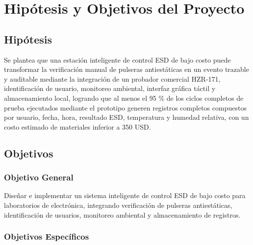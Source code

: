 \chapter{Hipótesis y Objetivos del Proyecto}

\section{Hipótesis}

Se plantea que una estación inteligente de control ESD de bajo costo puede transformar la verificación manual 
de pulseras antiestáticas en un evento trazable y auditable mediante la integración de un probador comercial HZR-171, 
identificación de usuario, monitoreo ambiental, interfaz gráfica táctil y almacenamiento local, logrando que al 
menos el 95 \% de los ciclos completos de prueba ejecutados mediante el prototipo generen registros completos 
compuestos por usuario, fecha, hora, resultado ESD, temperatura y humedad relativa, con un costo 
estimado de materiales inferior a 350 USD.

\section{Objetivos}

        \subsection{Objetivo General}
            Diseñar e implementar un sistema inteligente de control ESD de bajo costo para 
            laboratorios de electrónica, integrando verificación de pulseras antiestáticas, 
            identificación de usuarios, monitoreo ambiental y almacenamiento de registros.


        \subsection{Objetivos Específicos}
                
